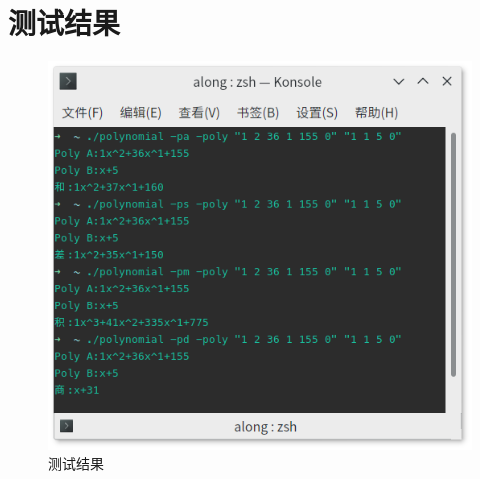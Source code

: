 \section{测试结果}
\begin{figure}[H]
    \centering
    \includegraphics[width=0.4\linewidth]{figures/test}
    \caption{测试结果}
    \label{fig:test}
\end{figure}